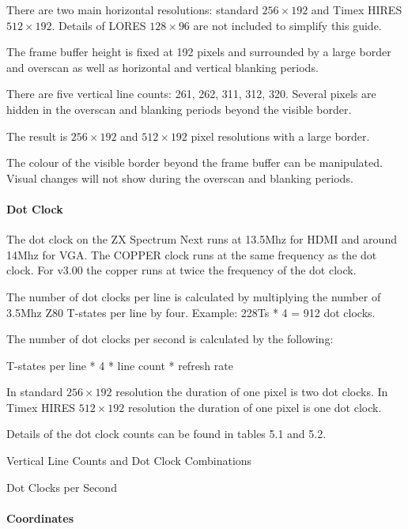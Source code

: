 There are two main horizontal resolutions: standard $256\times192$ and
Timex HIRES $512\times192$. Details of LORES $128\times96$ are not
included to simplify this guide.

The frame buffer height is fixed at 192 pixels and surrounded by a
large border and overscan as well as horizontal and vertical blanking
periods.

There are five vertical line counts: 261, 262, 311, 312, 320. Several
pixels are hidden in the overscan and blanking periods beyond the
visible border.

The result is $256\times192$ and $512\times192$ pixel resolutions with
a large border.

The colour of the visible border beyond the frame buffer can be
manipulated. Visual changes will not show during the overscan and
blanking periods.

\paragraph{Dot Clock}

The dot clock on the ZX Spectrum Next runs at 13.5Mhz for HDMI and
around 14Mhz for VGA. The COPPER clock runs at the same frequency as
the dot clock. For v3.00 the copper runs at twice the frequency of the
dot clock.

The number of dot clocks per line is calculated by multiplying the
number of 3.5Mhz Z80 T-states per line by four. Example: 228Ts * 4 =
912 dot clocks.

The number of dot clocks per second is calculated by the following:

T-states per line * 4 * line count * refresh rate

In standard $256\times192$ resolution the duration of one pixel is two
dot clocks. In Timex HIRES $512\times192$ resolution the duration of
one pixel is one dot clock.

Details of the dot clock counts can be found in tables 5.1 and 5.2.

\begin{table}[h]\centering
  \caption{Vertical Line Counts and Dot Clock Combinations}
\end{table}

\begin{table}[h]\centering
  \caption{Dot Clocks per Second}
\end{table}

\paragraph{Coordinates}


